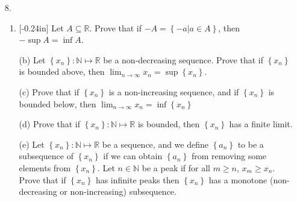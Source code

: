 \documentclass[letterpaper,12pt]{article}
\newcommand{\set}[1]{\left\{ #1 \right\}}
\theoremstyle{definition}
\begin{document}
\pagebreak
\begin{enumerate}
    \item[8.] \begin{enumerate}
    \item\reversemarginpar{}[-0.24in]   Let $A \subseteq \mathbb{R}$. Prove that if $-A = \set{-a | a \in A}$, then $-\sup A = \inf A$. 
\end{enumerate}
\end{enumerate}
\pagebreak
\begin{enumerate}
   \item[] \begin{enumerate}
       \item[(b)] Let $\set{x_n} : \mathbb{N} \mapsto \mathbb{R}$ be a non-decreasing sequence. Prove that if $\set{x_n}$ is bounded above, then $\lim_{n \rightarrow \infty} x_n = \sup \set{x_n}$. 
   \end{enumerate}
\end{enumerate}
\pagebreak
\begin{enumerate}
\item[]
\begin{enumerate}
    \item[(c)] Prove that if $\set{x_n}$ is a non-increasing sequence, and if $\set{x_n}$ is bounded below, then $\lim_{n \rightarrow \infty} x_n = \inf \set{x_n}$
   \end{enumerate}
\end{enumerate}
\pagebreak
\begin{enumerate}
    \item[] \begin{enumerate}
        \item[(d)] Prove that if $\set{x_n} : \mathbb{N} \mapsto \mathbb{R}$ is bounded, then $\set{x_n}$ has a finite limit.
    \end{enumerate}
\end{enumerate}
\pagebreak
\begin{enumerate}
    \item[] \begin{enumerate}
        \item[(e)] Let $\set{x_n} : \mathbb{N} \mapsto \mathbb{R}$ be a sequence, and we define $\set{a_n}$ to be a subsequence of $\set{x_n}$ if we can obtain $\set{a_n}$ from removing some elements from $\set{x_n}$. Let $n \in \mathbb{N}$ be a peak if for all $m \geq n$, $x_m \geq x_n$. Prove that if $\set{x_n}$ has infinite peaks then $\set{x_n}$ has a monotone (non-decreasing or non-increasing) subsequence. 
    \end{enumerate}
\end{enumerate}
\end{document}
